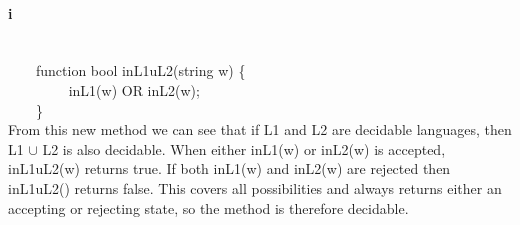 \documentclass[10pt,letter]{article}
\begin{document}
\paragraph{i}
\ \\
{\selectfont
$\qquad$function bool inL1uL2(string w) \{ \\
$\qquad$$\qquad$  inL1(w) OR inL2(w); \\
$\qquad$\} \\}
From this new method we can see that if L1 and L2 are decidable languages, then L1 $\cup$ L2 is also decidable. When either {\selectfont inL1(w)} or {\selectfont inL2(w)} is accepted, {\selectfont inL1uL2(w)} returns true. If both {\selectfont inL1(w)} and {\selectfont inL2(w)} are rejected then {\selectfont inL1uL2()} returns false. This covers all possibilities and always returns either an accepting or rejecting state, so the method is therefore decidable. 
\end{document}
